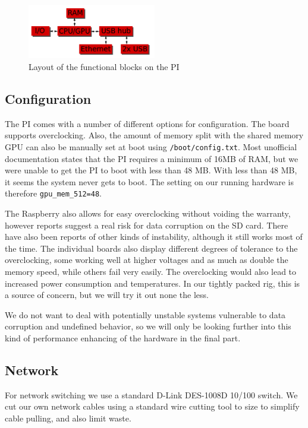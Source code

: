 \begin{figure}
	\centering
    \includegraphics[width=0.5\textwidth]{hardware/raspberrypi_block_function}
    \caption{Layout of the functional blocks on the PI}
    \label{fig:pi_blockdiagram}
\end{figure}

\subsection{Configuration}
The PI comes with a number of different options for configuration. The board supports overclocking. Also, the amount of memory split with the shared memory GPU can also be manually set at boot using {\tt /boot/config.txt}.
Most unofficial documentation states that the PI requires a minimum of 16MB of RAM, but we were unable to get the PI to boot with less than 48 MB. 
With less than 48 MB, it seems the system never gets to boot.
The setting on our running hardware is therefore {\tt gpu\_mem\_512=48}.

The Raspberry also allows for easy overclocking without voiding the warranty, however reports suggest a real risk for data corruption on the SD card. There have also been reports of other kinds of instability, although it still works most of the time. The individual boards also display different degrees of tolerance to the overclocking, some working well at higher voltages and as much as double the memory speed, while others fail very easily.
The overclocking would also lead to increased power consumption and temperatures. In our tightly packed rig, this is a source of concern, but we will try it out none the less.

We do not want to deal with potentially unstable systems vulnerable to data corruption and undefined behavior, so we will only be looking further into this kind of performance enhancing of the hardware in the final part.

\subsection{Network}
For network switching we use a standard D-Link DES-1008D 10/100 switch. We cut our own network cables using a standard wire cutting tool to size to simplify cable pulling, and also limit waste.

